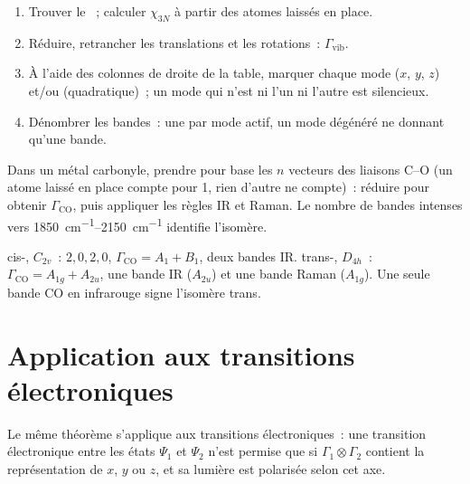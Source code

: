 \begin{method}\label{met:b3:group-theory-applied:vibrations}
\begin{enumerate}
  \item Trouver le ~; calculer $\chi_{3N}$ à partir des
        atomes laissés en place.
  \item Réduire, retrancher les translations et les rotations~:
        $\Gamma_{\mathrm{vib}}$.
  \item À l'aide des colonnes de droite de la table, marquer chaque mode
        ($x$, $y$, $z$) et/ou  (quadratique)~; un mode qui
        n'est ni l'un ni l'autre est silencieux.
  \item Dénombrer les bandes~: une par mode actif, un mode dégénéré ne
        donnant qu'une bande.
\end{enumerate}
\end{method}

\begin{method}\label{met:b3:group-theory-applied:co-count}
Dans un métal carbonyle, prendre pour base les $n$ vecteurs des liaisons
C--O (un atome laissé en
place compte pour 1, rien d'autre ne compte)~: réduire pour obtenir
$\Gamma_{\mathrm{CO}}$, puis appliquer
les règles IR et Raman. Le nombre de bandes intenses vers
\qtyrange{1850}{2150}{cm^{-1}} identifie l'isomère.
\end{method}

\begin{example}\label{ex:b3:group-theory-applied:cis-trans}
cis-, $C_{2v}$~:  $2, 0, 2, 0$, $\Gamma_{\mathrm{CO}} = A_1 + B_1$,
deux bandes IR. trans-, $D_{4h}$~: $\Gamma_{\mathrm{CO}} = A_{1g} + A_{2u}$,
une bande IR ($A_{2u}$) et une bande Raman ($A_{1g}$). Une seule bande CO
en infrarouge signe l'isomère trans.
\end{example}

\section{Application aux transitions électroniques}

Le même théorème s'applique aux transitions électroniques~: une transition
électronique entre les états $\Psi_1$ et $\Psi_2$ n'est permise que si
$\Gamma_1\otimes\Gamma_2$
contient la représentation de $x$, $y$ ou $z$, et sa lumière est
polarisée selon cet axe.

